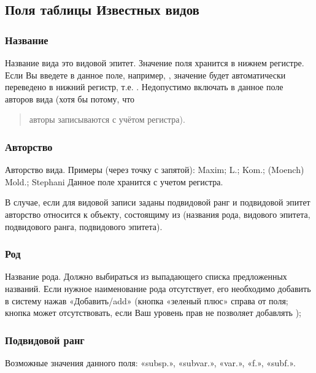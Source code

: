 \documentclass[letterpaper,10pt,russian]{sphinxmanual}
\begin{document}
\ignorespaces 

\subsection{Поля таблицы Известных видов}
\label{\detokenize{main:index-41}}\label{\detokenize{main:id44}}

\subsubsection{Название}
\label{\detokenize{main:id45}}
Название вида \textendash{} это видовой эпитет. Значение поля
хранится в нижнем регистре. Если Вы введете в данное поле, например,
, значение будет автоматически переведено в нижний регистр, т.е. .
Недопустимо включать в данное поле авторов вида (хотя бы потому, что
\begin{quote}

авторы записываются с учётом регистра).
\end{quote}


\subsubsection{Авторство}
\label{\detokenize{main:id46}}
Авторство вида. Примеры (через точку с запятой): Maxim; L.; Kom.; (Moench) Mold.; Stephani
Данное поле хранится с учетом регистра.

В случае, если для видовой записи заданы подвидовой ранг и подвидовой эпитет авторство относится
к объекту, состоящиму из (названия рода, видового эпитета, подвидового ранга, подвидового эпитета).


\subsubsection{Род}
\label{\detokenize{main:id47}}
Название рода. Должно выбираться из выпадающего списка предложенных названий.
Если нужное наименование рода отсутствует,
его необходимо добавить в систему нажав «Добавить/add» (кнопка «зеленый плюс»
справа от поля; кнопка может отсутствовать,
если Ваш уровень прав не позволяет добавлять );


\subsubsection{Подвидовой ранг}
\label{\detokenize{main:id48}}
Возможные значения данного поля: «subsp.», «subvar.», «var.», «f.», «subf.».
\end{document}
